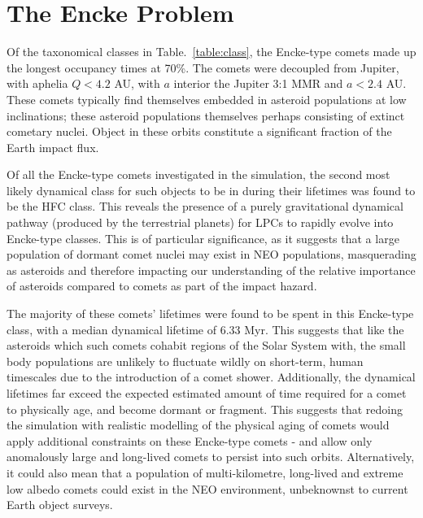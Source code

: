 \section{The Encke Problem}

Of the taxonomical classes in Table.~\ref{table:class}, the Encke-type comets made up the longest occupancy times at 70\%. The comets were decoupled from Jupiter, with aphelia $Q < 4.2$ AU, with $a$ interior the Jupiter 3:1 MMR and $a < 2.4$ AU. These comets typically find themselves embedded in asteroid populations at low inclinations; these asteroid populations themselves perhaps consisting of extinct cometary nuclei. Object in these orbits constitute a significant fraction of the Earth impact flux.

Of all the Encke-type comets investigated in the simulation, the second most likely dynamical class for such objects to be in during their lifetimes was found to be the HFC class. This reveals the presence of a purely gravitational dynamical pathway (produced by the terrestrial planets) for LPCs to rapidly evolve into Encke-type classes. This is of particular significance, as it suggests that a large population of dormant comet nuclei may exist in NEO populations, masquerading as asteroids and therefore impacting our understanding  of  the  relative  importance  of  asteroids  compared to comets as part of the impact hazard.

The majority of these comets' lifetimes were found to be spent in this Encke-type class, with a median dynamical lifetime of 6.33 Myr. This suggests that like the asteroids which such comets cohabit regions of the Solar System with, the small body populations are unlikely to fluctuate wildly on short-term, human timescales due to the introduction of a comet shower. Additionally, the dynamical lifetimes far exceed the expected estimated amount of time required for a comet to physically age, and become dormant or fragment. This suggests that redoing the simulation with realistic modelling of the physical aging of comets would apply additional constraints on these Encke-type comets -  and allow only anomalously large and long-lived comets to persist into such orbits. Alternatively, it could also mean that a population of multi-kilometre, long-lived and extreme low albedo comets could exist in the NEO environment, unbeknownst to current Earth object surveys.


